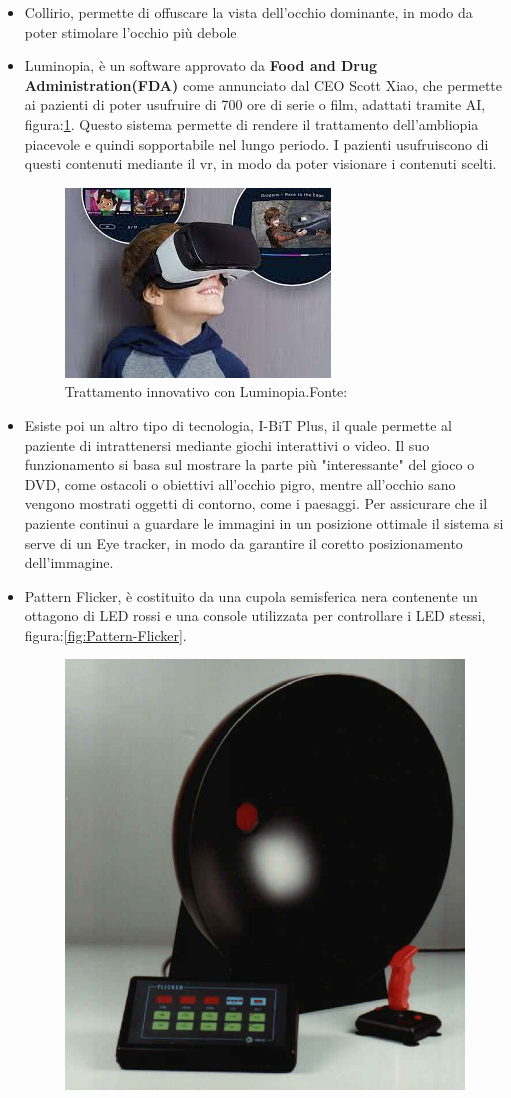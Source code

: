 \documentclass[
a4paper,
cleardoublepage=empty,
headings=twolinechapter,
numbers=autoenddot,
]{scrbook}
\begin{document}
\begin{itemize}
		\item Collirio, permette di offuscare la vista dell'occhio dominante, in modo da poter stimolare l'occhio più debole
		
		\item Luminopia, è un software approvato da \textbf{Food and Drug Administration(FDA)}\cite{Approvazione_luminopia} come annunciato dal CEO Scott Xiao, che permette ai pazienti di poter usufruire di 700 ore di serie o film, adattati tramite AI, figura:\ref{fig:luminopia}. Questo sistema permette di rendere il trattamento dell'ambliopia piacevole e quindi sopportabile nel lungo periodo.
		I pazienti usufruiscono di questi contenuti mediante il vr, in modo da poter visionare i contenuti scelti.
			\begin{figure}[H]
				\centering
				\includegraphics[width=0.6\linewidth]{image/luminopia}
				\caption{Trattamento innovativo con Luminopia.Fonte:\cite{Lumiopia_image}}
				\label{fig:luminopia}
			\end{figure}
	    \item Esiste poi un altro tipo di tecnologia, I-BiT Plus\cite{I-Bit}, il quale permette al paziente di intrattenersi mediante giochi interattivi o video.
	    Il suo funzionamento si basa sul mostrare la parte più "interessante" del gioco o DVD, come ostacoli o obiettivi all'occhio pigro, mentre all'occhio sano vengono mostrati oggetti di contorno, come i paesaggi.
	    Per assicurare che il paziente continui a guardare le immagini in un posizione ottimale il sistema si serve di un Eye tracker, in modo da garantire il coretto posizionamento dell'immagine.
	    	\item Pattern Flicker\cite{Pattern-Flicker}, è costituito da una cupola semisferica nera contenente un ottagono di LED rossi e una console utilizzata per controllare i LED stessi, figura:\ref{fig:Pattern-Flicker}.
	    \begin{figure}[H]
	    	\centering
	    	\includegraphics[width=0.4\linewidth]{image/Pattern_Flicker}

\end{figure}
\end{itemize}
\end{document}
